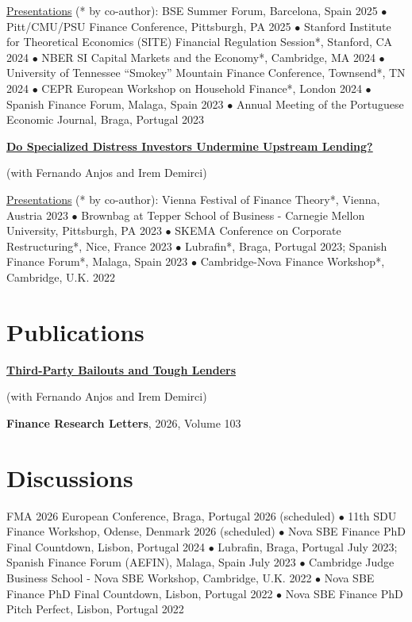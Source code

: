 \documentclass[letterpaper]{article}
\newenvironment{itemize*}{
  \begin{list}{}{
    \setlength{\leftmargin}{1.5em}
  }
}{
  \end{list}
}
\begin{document}
\begin{itemize*}
	\underline{Presentations} (* by co-author): BSE Summer Forum, Barcelona, Spain 2025 $\bullet$ Pitt/CMU/PSU Finance Conference, Pittsburgh, PA 2025 $\bullet$ Stanford Institute for Theoretical Economics (SITE) Financial Regulation Session*, Stanford, CA 2024 $\bullet$ NBER SI Capital Markets and the Economy*, Cambridge, MA 2024 $\bullet$ University of Tennessee ``Smokey'' Mountain Finance Conference, Townsend*, TN 2024 $\bullet$ CEPR European Workshop on Household Finance*, London 2024 $\bullet$ Spanish Finance Forum, Malaga, Spain 2023 $\bullet$ Annual Meeting of the Portuguese Economic Journal, Braga, Portugal 2023
\medskip
	
\item \href{https://papers.ssrn.com/sol3/papers.cfm?abstract_id=4395807}{\color{blue}\textbf{Do Specialized Distress Investors Undermine Upstream Lending?}}

	(with Fernando Anjos and Irem Demirci)

	\underline{Presentations} (* by co-author): Vienna Festival of Finance Theory*, Vienna, Austria 2023 $\bullet$ Brownbag at Tepper School of Business - Carnegie Mellon University, Pittsburgh, PA 2023 $\bullet$ SKEMA Conference on Corporate Restructuring*, Nice, France 2023 $\bullet$ Lubrafin*, Braga, Portugal 2023; Spanish Finance Forum*, Malaga, Spain 2023 $\bullet$ Cambridge-Nova Finance Workshop*, Cambridge, U.K. 2022
\end{itemize*}

\section*{Publications}
\vspace{-0.2in}
\hrulefill

\begin{itemize*}	
\item \href{https://www.sciencedirect.com/science/article/pii/S1544612326006823}{\color{blue}\textbf{Third-Party Bailouts and Tough Lenders}}

	(with Fernando Anjos and Irem Demirci)
	
	\textbf{Finance Research Letters}, 2026, Volume 103
	
\end{itemize*}

\section*{Discussions}
\vspace{-0.2in}
\hrulefill
\begin{itemize*}
\item FMA 2026 European Conference, Braga, Portugal 2026 (scheduled) $\bullet$ 11th SDU Finance Workshop, Odense, Denmark 2026 (scheduled) $\bullet$ Nova SBE Finance PhD Final Countdown, Lisbon, Portugal 2024 $\bullet$ Lubrafin, Braga, Portugal July 2023; Spanish Finance Forum (AEFIN), Malaga, Spain July 2023 $\bullet$ Cambridge Judge Business School - Nova SBE Workshop,  Cambridge, U.K. 2022 $\bullet$ Nova SBE Finance PhD Final Countdown, Lisbon, Portugal 2022 $\bullet$ Nova SBE Finance PhD Pitch Perfect, Lisbon, Portugal 2022
\end{itemize*}
\end{document}
